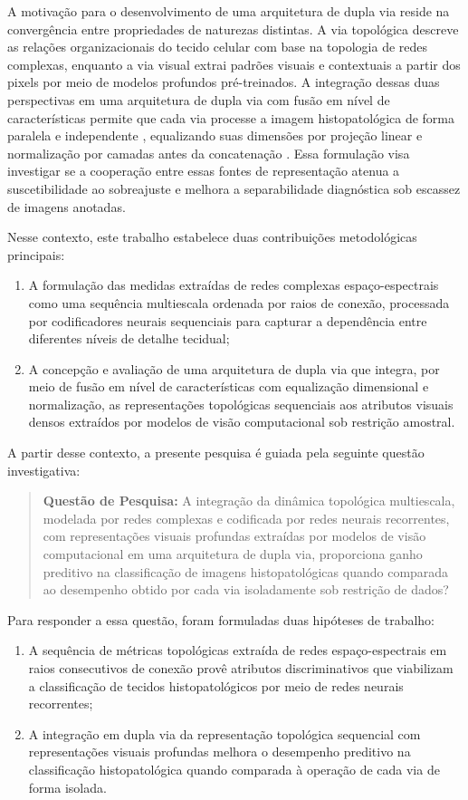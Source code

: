 A motivação para o desenvolvimento de uma arquitetura de dupla via reside na convergência entre propriedades de naturezas distintas. A via topológica descreve as relações organizacionais do tecido celular com base na topologia de redes complexas, enquanto a via visual extrai padrões visuais e contextuais a partir dos pixels por meio de modelos profundos pré-treinados. A integração dessas duas perspectivas em uma arquitetura de dupla via com fusão em nível de características permite que cada via processe a imagem histopatológica de forma paralela e independente \cite{simonyan2014two,wang2023stnet}, equalizando suas dimensões por projeção linear e normalização por camadas antes da concatenação \cite{ba2016layer,huang2022fusing}. Essa formulação visa investigar se a cooperação entre essas fontes de representação atenua a suscetibilidade ao sobreajuste e melhora a separabilidade diagnóstica sob escassez de imagens anotadas.

Nesse contexto, este trabalho estabelece duas contribuições metodológicas principais:
\begin{enumerate}
    \item A formulação das medidas extraídas de redes complexas espaço-espectrais como uma sequência multiescala ordenada por raios de conexão, processada por codificadores neurais sequenciais para capturar a dependência entre diferentes níveis de detalhe tecidual;
    \item A concepção e avaliação de uma arquitetura de dupla via que integra, por meio de fusão em nível de características com equalização dimensional e normalização, as representações topológicas sequenciais aos atributos visuais densos extraídos por modelos de visão computacional sob restrição amostral.
\end{enumerate}

A partir desse contexto, a presente pesquisa é guiada pela seguinte questão investigativa:
\begin{quote}
    \textbf{Questão de Pesquisa:} A integração da dinâmica topológica multiescala, modelada por redes complexas e codificada por redes neurais recorrentes, com representações visuais profundas extraídas por modelos de visão computacional em uma arquitetura de dupla via, proporciona ganho preditivo na classificação de imagens histopatológicas quando comparada ao desempenho obtido por cada via isoladamente sob restrição de dados?
\end{quote}

Para responder a essa questão, foram formuladas duas hipóteses de trabalho:
\begin{enumerate}
    \item A sequência de métricas topológicas extraída de redes espaço-espectrais em raios consecutivos de conexão provê atributos discriminativos que viabilizam a classificação de tecidos histopatológicos por meio de redes neurais recorrentes;
    \item A integração em dupla via da representação topológica sequencial com representações visuais profundas melhora o desempenho preditivo na classificação histopatológica quando comparada à operação de cada via de forma isolada.
\end{enumerate}

